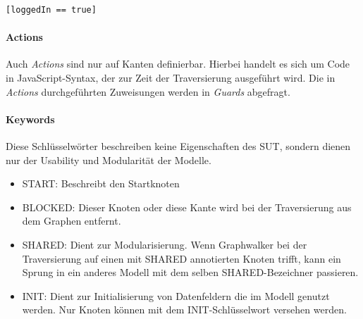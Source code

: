 \begin{verbatim}
[loggedIn == true]
\end{verbatim}

\paragraph{Actions} Auch \textit{Actions} sind nur auf Kanten definierbar. Hierbei handelt es sich um Code in JavaScript-Syntax, der zur Zeit der Traversierung ausgeführt wird. Die in \textit{Actions} durchgeführten Zuweisungen werden in \textit{Guards} abgefragt.

\paragraph{Keywords} Diese Schlüsselwörter beschreiben keine Eigenschaften des SUT, sondern dienen nur der Usability und Modularität der Modelle.

\begin{itemize}
\item START: Beschreibt den Startknoten
\item BLOCKED: Dieser Knoten oder diese Kante wird bei der Traversierung aus dem Graphen entfernt.
\item SHARED: Dient zur Modularisierung. Wenn Graphwalker bei der Traversierung auf einen mit SHARED annotierten Knoten trifft, kann ein Sprung in ein anderes Modell mit dem selben SHARED-Bezeichner passieren.
\item INIT: Dient zur Initialisierung von Datenfeldern die im Modell genutzt werden. Nur Knoten können mit dem INIT-Schlüsselwort versehen werden.
\end{itemize} 

